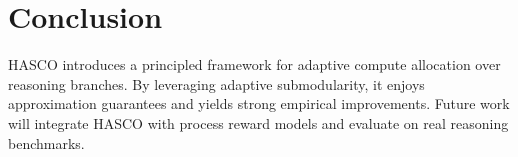 \documentclass{article}
\begin{document}
\section{Conclusion}
HASCO introduces a principled framework for adaptive compute allocation over reasoning branches. By leveraging adaptive submodularity, it enjoys approximation guarantees and yields strong empirical improvements. Future work will integrate HASCO with process reward models and evaluate on real reasoning benchmarks.



\end{document}
